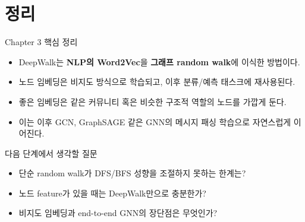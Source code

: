 \section{정리}

\begin{frame}{Chapter 3 핵심 정리}
\begin{itemize}
  \item DeepWalk는 \textbf{NLP의 Word2Vec}을 \textbf{그래프 random walk}에 이식한 방법이다.
  \item 노드 임베딩은 비지도 방식으로 학습되고, 이후 분류/예측 태스크에 재사용된다.
  \item 좋은 임베딩은 같은 커뮤니티 혹은 비슷한 구조적 역할의 노드를 가깝게 둔다.
  \item 이는 이후 GCN, GraphSAGE 같은 GNN의 메시지 패싱 학습으로 자연스럽게 이어진다.
\end{itemize}
\end{frame}

\begin{frame}{다음 단계에서 생각할 질문}
\begin{itemize}
  \item 단순 random walk가 DFS/BFS 성향을 조절하지 못하는 한계는?
  \item 노드 feature가 있을 때는 DeepWalk만으로 충분한가?
  \item 비지도 임베딩과 end-to-end GNN의 장단점은 무엇인가?
\end{itemize}
\end{frame}
